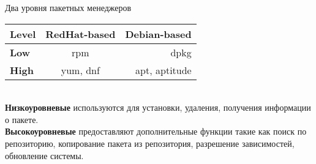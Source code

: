 \begin{frame}{Два уровня пакетных менеджеров}

\begin{tabular}{| l | c | r |}
      \hline
          Level &  RedHat-based & Debian-based \\ 
      \hline
          {\bf Low} & rpm & dpkg \\ 
      \hline
          {\bf High} & yum, dnf & apt, aptitude \\
      \hline
    \end{tabular}
    \\

    {\bf Низкоуровневые} используются для установки, удаления, получения информации о пакете. \\
    {\bf Высокоуровневые} предоставляют дополнительные функции такие как поиск по репозиторию, копирование пакета из репозитория, разрешение зависимостей, обновление системы.

\end{frame}
